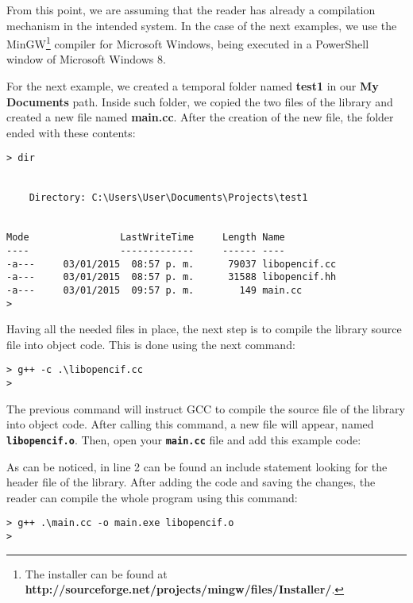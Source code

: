 \documentclass[11pt,twoside,openany,x11names,svgnames]{memoir}
\begin{document}
From this point, we are assuming that the reader has already a compilation mechanism in the intended system. In the case of the next examples, we use the MinGW\footnote{The installer can be found at \textbf{http://sourceforge.net/projects/mingw/files/Installer/}.} compiler for Microsoft Windows, being executed in a PowerShell window of Microsoft Windows 8.

For the next example, we created a temporal folder named \textbf{test1} in our \textbf{My Documents} path. Inside such folder, we copied the two files of the library and created a new file named \textbf{main.cc}. After the creation of the new file, the folder ended with these contents:

\begin{lstlisting}[frame=single,style=SystemCommandStyle]
> dir


    Directory: C:\Users\User\Documents\Projects\test1


Mode                LastWriteTime     Length Name
----                -------------     ------ ----
-a---     03/01/2015  08:57 p. m.      79037 libopencif.cc
-a---     03/01/2015  08:57 p. m.      31588 libopencif.hh
-a---     03/01/2015  09:57 p. m.        149 main.cc
>
\end{lstlisting}

Having all the needed files in place, the next step is to compile the library source file into object code. This is done using the next command:

\begin{lstlisting}[frame=single,style=SystemCommandStyle]
> g++ -c .\libopencif.cc
>
\end{lstlisting}

The previous command will instruct GCC to compile the source file of the library into object code. After calling this command, a new file will appear, named \textbf{\texttt{libopencif.o}}. Then, open your \textbf{\texttt{main.cc}} file and add this example code:



As can be noticed, in line 2 can be found an include statement looking for the header file of the library. After adding the code and saving the changes, the reader can compile the whole program using this command:

\begin{lstlisting}[frame=single,style=SystemCommandStyle]
> g++ .\main.cc -o main.exe libopencif.o
>
\end{lstlisting}
\end{document}
